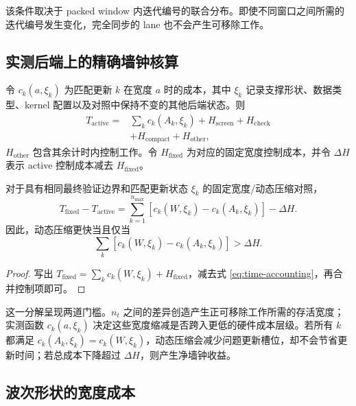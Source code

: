 该条件取决于 packed window 内迭代编号的联合分布。即使不同窗口之间所需的迭代编号发生变化，完全同步的 lane 也不会产生可移除工作。

\subsection{实测后端上的精确墙钟核算}

令 $c_k(a,\xi_k)$ 为匹配更新 $k$ 在宽度 $a$ 时的成本，其中 $\xi_k$ 记录支撑形状、数据类型、kernel 配置以及对照中保持不变的其他后端状态。则
\begin{equation}
\begin{split}
T_{\mathrm{active}}={}&\sum_k c_k(A_k,\xi_k)
+H_{\mathrm{screen}}+H_{\mathrm{check}}\\
&+H_{\mathrm{compact}}+H_{\mathrm{other}},
\end{split}
\label{eq:time-accounting}
\end{equation}
$H_{\mathrm{other}}$ 包含其余计时内控制工作。令 $H_{\mathrm{fixed}}$ 为对应的固定宽度控制成本，并令 $\Delta H$ 表示 active 控制成本减去 $H_{\mathrm{fixed}}$。

\begin{proposition}[机会--转化分解]
对于具有相同最终验证边界和匹配更新状态 $\xi_k$ 的固定宽度/动态压缩对照，
\begin{equation}
T_{\mathrm{fixed}}-T_{\mathrm{active}}
=\sum_{k=1}^{n_{\max}}\left[c_k(W,\xi_k)-c_k(A_k,\xi_k)\right]-\Delta H.
\label{eq:time-difference}
\end{equation}
因此，动态压缩更快当且仅当
\begin{equation}
\sum_k\!\left[c_k(W,\xi_k)-c_k(A_k,\xi_k)\right]
>\Delta H.
\label{eq:active-gate}
\end{equation}
\end{proposition}
\begin{proof}
写出 $T_{\mathrm{fixed}}=\sum_k c_k(W,\xi_k)+H_{\mathrm{fixed}}$，减去式 \eqref{eq:time-accounting}，再合并控制项即可。
\end{proof}

这一分解呈现两道门槛。$n_t$ 之间的差异创造产生正可移除工作所需的存活宽度；实测函数 $c_k(a,\xi_k)$ 决定这些宽度缩减是否跨入更低的硬件成本层级。若所有 $k$ 都满足 $c_k(A_k,\xi_k)=c_k(W,\xi_k)$，动态压缩会减少问题更新槽位，却不会节省更新时间；若总成本下降超过 $\Delta H$，则产生净墙钟收益。

\subsection{波次形状的宽度成本}

